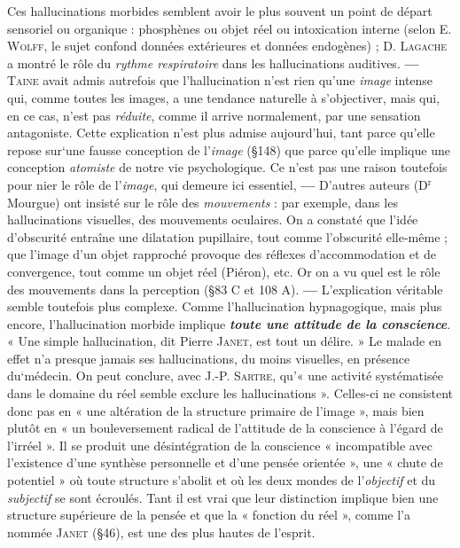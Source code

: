 Ces hallucinations morbides semblent avoir le plus souvent un
point de départ sensoriel ou organique : phosphènes ou objet réel
ou intoxication interne (selon E. \textsc{Wolff}, le sujet confond données
extérieures et données endogènes) ; D. \textsc{Lagache} a montré le
rôle du {\it rythme respiratoire} dans les hallucinations auditives. {\bf —}
\textsc{Taine} avait admis autrefois que l’hallucination n’est rien qu’une
{\it image} intense qui, comme toutes les images, a une tendance naturelle
à s’objectiver, mais qui, en ce cas, n’est pas {\it réduite}, comme il
arrive normalement, par une sensation antagoniste. Cette explication
n’est plus admise aujourd’hui, tant parce qu’elle repose sur‘une fausse
conception de l’{\it image} (\S 148) que parce qu’elle implique une conception
{\it atomiste} de notre vie psychologique. Ce n’est pas une raison toutefois
pour nier le rôle de l’{\it image}, qui demeure ici essentiel, {\bf —} D’autres
auteurs (D$^\text{r}$ Mourgue) ont insisté sur le rôle des {\it mouvements} : par
exemple, dans les hallucinations visuelles, des mouvements oculaires.
On a constaté que l’idée d’obscurité entraîne une dilatation pupillaire,
tout comme l’obscurité elle-même ; que l’image d’un objet rapproché
provoque des réflexes d’accommodation et de convergence,
tout comme un objet réel (Piéron), etc. Or on a vu quel est le rôle
des mouvements dans la perception (\S 83 C et 108 A). {\bf —} L'explication
véritable semble toutefois plus complexe. Comme l’hallucination
hypnagogique, mais plus encore, l’hallucination morbide implique
\textbf{\textit {toute une attitude de la conscience}}. « Une simple hallucination, dit
Pierre \textsc{Janet}, est tout un délire. » Le malade en effet n’a presque
jamais ses hallucinations, du moins visuelles, en présence du‘médecin.
On peut conclure, avec J.-P. \textsc{Sartre}, qu’« une activité systématisée
dans le domaine du réel semble exclure les hallucinations ». Celles-ci
ne consistent donc pas en « une altération de la structure primaire de
l’image », mais bien plutôt en « un bouleversement radical de l’attitude
de la conscience à l’égard de l’irréel ». Il se produit une désintégration
de la conscience « incompatible avec l’existence d'une synthèse
personnelle et d’une pensée orientée », une « chute de potentiel »
où toute structure s’abolit et où les deux mondes de l'{\it objectif} et
du {\it subjectif} se sont écroulés. Tant il est vrai que leur distinction
implique bien une structure supérieure de la pensée et que la « fonction
du réel », comme l’a nommée \textsc{Janet} (\S 46), est une des plus
hautes de l’esprit.

